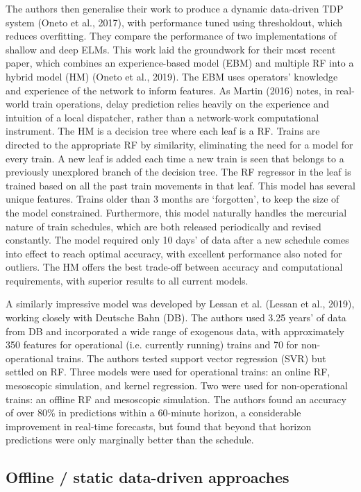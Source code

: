 \documentclass[12pt,a4paper]{article}
\begin{document}
The authors then generalise their work to produce a dynamic data-driven TDP system (Oneto et al., 2017), with performance tuned using thresholdout, which reduces overfitting. They compare the performance of two implementations of shallow and deep ELMs. 
This work laid the groundwork for their most recent paper, which combines an experience-based model (EBM) and multiple RF into a hybrid model (HM) (Oneto et al., 2019). The EBM uses operators’ knowledge and experience of the network to inform features. As Martin (2016) notes, in real-world train operations, delay prediction relies heavily on the experience and intuition of a local dispatcher, rather than a network-work computational instrument. The HM is a decision tree where each leaf is a RF. Trains are directed to the appropriate RF by similarity, eliminating the need for a model for every train. A new leaf is added each time a new train is seen that belongs to a previously unexplored branch of the decision tree. The RF regressor in the leaf is trained based on all the past train movements in that leaf. This model has several unique features. Trains older than 3 months are ‘forgotten’, to keep the size of the model constrained. Furthermore, this model naturally handles the mercurial nature of train schedules, which are both released periodically and revised constantly. The model required only 10 days’ of data after a new schedule comes into effect to reach optimal accuracy, with excellent performance also noted for outliers. The HM offers the best trade-off between accuracy and computational requirements, with superior results to all current models. 

A similarly impressive model was developed by Lessan et al. (Lessan et al., 2019), working closely with Deutsche Bahn (DB). The authors used 3.25 years’ of data from DB and incorporated a wide range of exogenous data, with approximately 350 features for operational (i.e. currently running) trains and 70 for non-operational trains. The authors tested support vector regression (SVR) but settled on RF. Three models were used for operational trains: an online RF, mesoscopic simulation, and kernel regression. Two were used for non-operational trains: an offline RF and mesoscopic simulation. The authors found an accuracy of over 80\% in predictions within a 60-minute horizon, a considerable improvement in real-time forecasts, but found that beyond that horizon predictions were only marginally better than the schedule. 

\subsection{Offline / static data-driven approaches}
\end{document}
